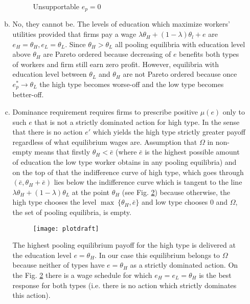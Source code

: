 \documentclass[a4paper]{article}
\begin{document}
\begin{enumerate}
\begin{enumerate}[(a)]
\begin{figure}[H]
		\caption{Unsupportable $e_p = 0$}\label{fig8}
	\end{figure}
	\item No, they cannot be. The levels of education which maximize workers' utilities provided that firms pay a wage $\lambda \theta_H + (1 - \lambda) \theta_l + e$ are $e_H = \theta_H, e_L = \theta_L$. Since $\theta_H > \theta_L$ all pooling equilibria with education level above $\theta_H$ are Pareto ordered because decreasing of $e$ benefits both types of workers and firm still earn zero profit. However, equilibria with education level between $\theta_L$ and $\theta_H$ are not Pareto ordered because once $e^*_p \to \theta_L$ the high type becomes worse-off and the low type becomes better-off.
\item Dominance requirement requires firms to prescribe positive $\mu(e)$ only to such $e$ that is not a strictly dominated action for high type. In the sense that there is no action $e'$ which yields the high type strictly greater payoff regardless of what equilibrium wages are. Assumption that $\Omega$ in non-empty means that firstly $\theta_H < \bar{e}$ (where $\bar{e}$ is the highest possible amount of education the low type worker obtains in any pooling equilibria) and on the top of that the indifference curve of high type, which goes through $(\bar{e}, \theta_H + \bar{e})$ lies below the indifference curve which is tangent to the line $\lambda \theta_H + (1 - \lambda) \theta_L$ at the point $\theta_H$ (see Fig. \ref{fig6}) because otherwise, the high type chooses the level $\max\ \{\theta_H, \bar{e}\}$ and low type chooses $0$ and $\Omega$, the set of pooling equilibria, is empty.
	\begin{figure}[H]
	\centering
	\texttt{[image: plotdraft]}
	\caption{}\label{fig6}
\end{figure} 
The highest pooling equilibrium payoff for the high type is delivered at the education level $e = \theta_H$. In our case this equilibrium belongs to $\Omega$ because neither of types have $e = \theta_H$ as a strictly dominated action. On the Fig. \ref{fig6} there is a wage schedule for which $e_H = e_L = \theta_H$ is the best response for both types (i.e. there is no action which strictly dominates this action).
	\end{enumerate}
\end{enumerate}
\end{document}
